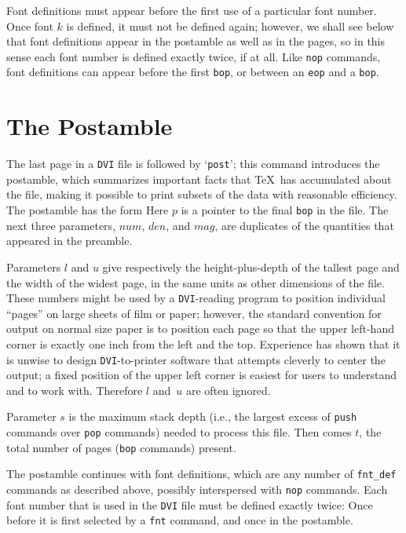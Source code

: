 \documentclass[10pt, a4paper]{article}
\begin{document}
Font definitions must appear before the first use of a particular font number.
Once font $k$ is defined, it must not be defined again; 
however, we shall see below 
that font definitions appear in the postamble as well as in the pages, 
so in this sense each font number is defined exactly twice, if at all. 
Like \texttt{nop} commands, 
font definitions can appear before the first \texttt{bop}, 
or between an \texttt{eop} and a \texttt{bop}. 

\section{The Postamble}
\label{sec:postamble}

The last page in a \texttt{DVI} file is followed by `\texttt{post}'; 
this command introduces the postamble, 
which summarizes important facts that \TeX\ has accumulated about the file, 
making it possible to print subsets of the data with reasonable efficiency. 
The postamble has the form
Here $p$ is a pointer to the final \texttt{bop} in the file. The next three
parameters, $num$, $den$, and $mag$, are duplicates of the quantities that
appeared in the preamble.

Parameters $l$ and $u$ give respectively the height-plus-depth of the tallest
page and the width of the widest page, in the same units as other dimensions
of the file. These numbers might be used by a \texttt{DVI}-reading program to
position individual ``pages'' on large sheets of film or paper; however,
the standard convention for output on normal size paper is to position each
page so that the upper left-hand corner is exactly one inch from the left
and the top. 
Experience has shown that it is unwise to design \texttt{DVI}-to-printer
software that attempts cleverly to center the output; a fixed position of
the upper left corner is easiest for users to understand and to work with.
Therefore $l$ and~$u$ are often ignored.

Parameter $s$ is the maximum stack depth 
(i.e., 
the largest excess of \texttt{push} commands over \texttt{pop} commands)
 needed to process this file. 
Then comes $t$, the total number of pages (\texttt{bop} commands) present.

The postamble continues with font definitions, 
which are any number of \texttt{fnt\_def} commands as described above, 
possibly interspersed with \texttt{nop} commands. 
Each font number that is used in the \texttt{DVI} file must be defined
exactly twice: Once before it is first selected by a \texttt{fnt} command, 
and once in the postamble.
\end{document}
